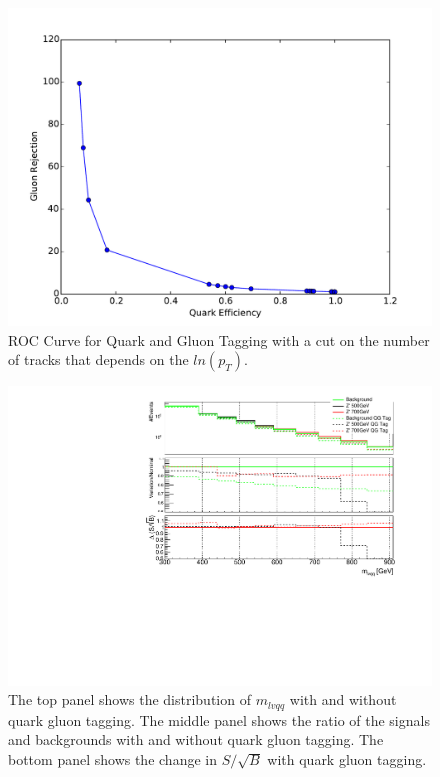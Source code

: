 \begin{figure}[h!]
  \centering
  \includegraphics[width=\hsize]{figures/QGT/finalroc.pdf}
  \caption{ROC Curve for Quark and Gluon Tagging with a cut on the number of tracks that depends on the $ln(p_{T})$.}
  \label{fig:quark_gluon_roc}
\end{figure}
\FloatBarrier


\begin{figure}[h!]
  \centering
  \includegraphics[width=\hsize]{figures/QGT/s_root_b_recotag.pdf}
  \caption{The top panel shows the distribution of $m_{lvqq}$ with and without quark gluon tagging. The middle panel shows the ratio of the signals and backgrounds with and without quark gluon tagging. The bottom panel shows the change in $S/\sqrt{B}$ with quark gluon tagging.}
  \label{fig:qg_s_root_b}
\end{figure}
\FloatBarrier



